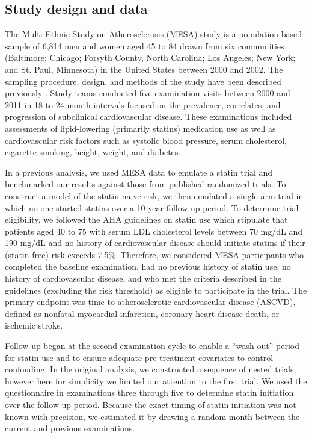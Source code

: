 \subsection{Study design and data}
The Multi-Ethnic Study on Atherosclerosis (MESA) study is a population-based sample of 6,814 men and women aged 45 to 84 drawn from six communities (Baltimore; Chicago; Forsyth County, North Carolina; Los Angeles; New York; and St. Paul, Minnesota) in the United States between 2000 and 2002. The sampling procedure, design, and methods of the study have been described previously \cite{bild_multi-ethnic_2002}. Study teams conducted five examination visits between 2000 and 2011 in 18 to 24 month intervals focused on the prevalence, correlates, and progression of subclinical cardiovascular disease. These examinations included assessments of lipid-lowering (primarily statins) medication use as well as cardiovascular risk factors such as systolic blood pressure, serum cholesterol, cigarette smoking, height, weight, and diabetes. 

In a previous analysis, we used MESA data to emulate a statin trial and benchmarked our results against those from published randomized trials. To construct a model of the statin-naive risk, we then emulated a single arm trial in which no one started statins over a 10-year follow up period. To determine trial eligibility, we followed the AHA guidelines \cite{grundy_scott_m_2018_2019} on statin use which stipulate that patients aged 40 to 75 with serum LDL cholesterol levels between 70 mg/dL and 190 mg/dL and no history of cardiovascular disease should initiate statins if their (statin-free) risk exceeds 7.5\%. Therefore, we considered MESA participants who completed the baseline examination, had no previous history of statin use, no history of cardiovascular disease, and who met the criteria described in the guidelines (excluding the risk threshold) as eligible to participate in the trial. The primary endpoint was time to atherosclerotic cardiovascular disease (ASCVD), defined as nonfatal myocardial infarction, coronary heart disease death, or ischemic stroke. 

Follow up began at the second examination cycle to enable a ``wash out'' period for statin use and to ensure adequate pre-treatment covariates to control confouding. In the original analysis, we constructed a sequence of nested trials, however here for simplicity we limited our attention to the first trial. We used the questionnaire in examinations three through five to determine statin initiation over the follow up period. Because the exact timing of statin initiation was not known with precision, we estimated it by drawing a random month between the current and previous examinations. 

